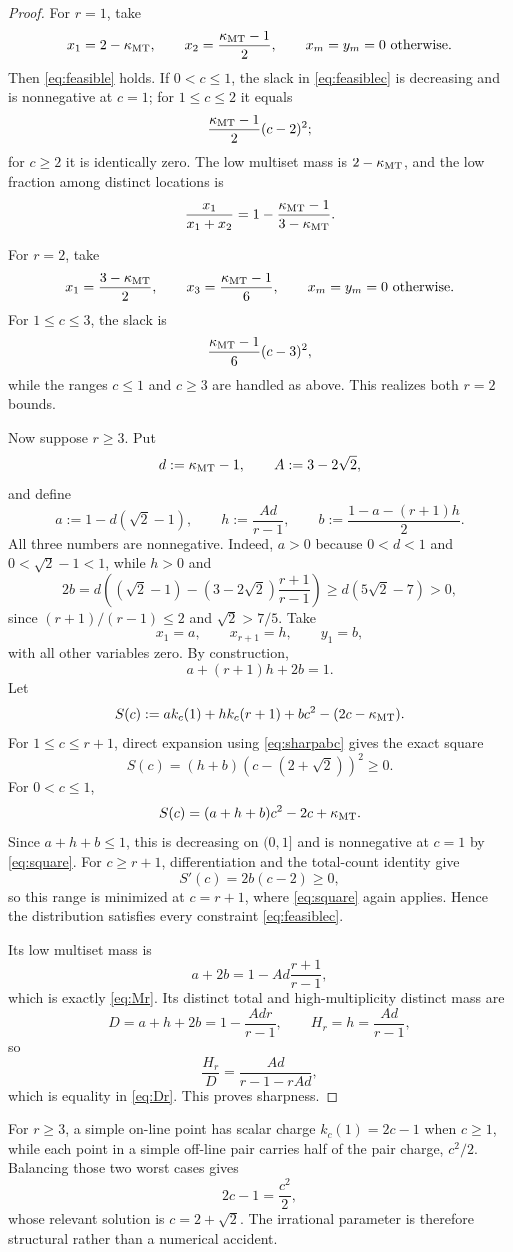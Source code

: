 \begin{proof}
For $r=1$, take
\[
x_1=2-\kappa_{\mathrm{MT}},
\qquad
x_2=\frac{\kappa_{\mathrm{MT}}-1}{2},
\qquad
x_m=y_m=0\ \text{otherwise}.
\]
Then \eqref{eq:feasible} holds.  If $0<c\leq1$, the slack in \eqref{eq:feasiblec} is decreasing and is nonnegative at $c=1$; for $1\leq c\leq2$ it equals
\[
\frac{\kappa_{\mathrm{MT}}-1}{2}(c-2)^2;
\]
for $c\geq2$ it is identically zero.  The low multiset mass is $2-\kappa_{\mathrm{MT}}$, and the low fraction among distinct locations is
\[
\frac{x_1}{x_1+x_2}=1-\frac{\kappa_{\mathrm{MT}}-1}{3-\kappa_{\mathrm{MT}}}.
\]

For $r=2$, take
\[
x_1=\frac{3-\kappa_{\mathrm{MT}}}{2},
\qquad
x_3=\frac{\kappa_{\mathrm{MT}}-1}{6},
\qquad
x_m=y_m=0\ \text{otherwise}.
\]
For $1\leq c\leq3$, the slack is
\[
\frac{\kappa_{\mathrm{MT}}-1}{6}(c-3)^2,
\]
while the ranges $c\leq1$ and $c\geq3$ are handled as above.  This realizes both $r=2$ bounds.

Now suppose $r\geq3$.  Put
\[
d:=\kappa_{\mathrm{MT}}-1,
\qquad
A:=3-2\sqrt2,
\]
and define
\begin{equation}\label{eq:sharpabc}
a:=1-d(\sqrt2-1),
\qquad
h:=\frac{Ad}{r-1},
\qquad
b:=\frac{1-a-(r+1)h}{2}.
\end{equation}
All three numbers are nonnegative.  Indeed, $a>0$ because $0<d<1$ and $0<\sqrt2-1<1$, while $h>0$ and
\[
2b=d\left((\sqrt2-1)-(3-2\sqrt2)\frac{r+1}{r-1}\right)
\geq d(5\sqrt2-7)>0,
\]
since $(r+1)/(r-1)\leq2$ and $\sqrt2>7/5$.  Take
\[
x_1=a,
\qquad
x_{r+1}=h,
\qquad
y_1=b,
\]
with all other variables zero.  By construction,
\[
a+(r+1)h+2b=1.
\]
Let
\[
S(c):=a k_c(1)+h k_c(r+1)+bc^2-(2c-\kappa_{\mathrm{MT}}).
\]
For $1\leq c\leq r+1$, direct expansion using \eqref{eq:sharpabc} gives the exact square
\begin{equation}\label{eq:square}
S(c)=(h+b)(c-(2+\sqrt2))^2\geq0.
\end{equation}
For $0<c\leq1$,
\[
S(c)=(a+h+b)c^2-2c+\kappa_{\mathrm{MT}}.
\]
Since $a+h+b\leq1$, this is decreasing on $(0,1]$ and is nonnegative at $c=1$ by \eqref{eq:square}.  For $c\geq r+1$, differentiation and the total-count identity give
\[
S'(c)=2b(c-2)\geq0,
\]
so this range is minimized at $c=r+1$, where \eqref{eq:square} again applies.  Hence the distribution satisfies every constraint \eqref{eq:feasiblec}.

Its low multiset mass is
\[
a+2b
=1-Ad\frac{r+1}{r-1},
\]
which is exactly \eqref{eq:Mr}.  Its distinct total and high-multiplicity distinct mass are
\[
D=a+h+2b=1-\frac{Adr}{r-1},
\qquad
H_r=h=\frac{Ad}{r-1},
\]
so
\[
\frac{H_r}{D}=\frac{Ad}{r-1-rAd},
\]
which is equality in \eqref{eq:Dr}.  This proves sharpness.
\end{proof}

\begin{remark}
For $r\geq3$, a simple on-line point has scalar charge $k_c(1)=2c-1$ when $c\geq1$, while each point in a simple off-line pair carries half of the pair charge, $c^2/2$.  Balancing those two worst cases gives
\[
2c-1=\frac{c^2}{2},
\]
whose relevant solution is $c=2+\sqrt2$.  The irrational parameter is therefore structural rather than a numerical accident.
\end{remark}
